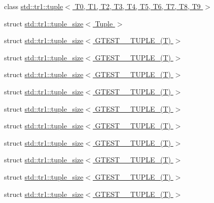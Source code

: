 \begin{DoxyCompactItemize}
class \hyperlink{classstd_1_1tr1_1_1tuple}{std\-::tr1\-::tuple$<$ T0, T1, T2, T3, T4, T5, T6, T7, T8, T9 $>$}
\item 
struct \hyperlink{structstd_1_1tr1_1_1tuple__size}{std\-::tr1\-::tuple\-\_\-size$<$ Tuple $>$}
\item 
struct \hyperlink{structstd_1_1tr1_1_1tuple__size_3_01_g_t_e_s_t__0___t_u_p_l_e___07_t_08_01_4}{std\-::tr1\-::tuple\-\_\-size$<$ G\-T\-E\-S\-T\-\_\-\_\-\-T\-U\-P\-L\-E\-\_\-(\-T) $>$}
\item 
struct \hyperlink{structstd_1_1tr1_1_1tuple__size_3_01_g_t_e_s_t__1___t_u_p_l_e___07_t_08_01_4}{std\-::tr1\-::tuple\-\_\-size$<$ G\-T\-E\-S\-T\-\_\-\_\-\-T\-U\-P\-L\-E\-\_\-(\-T) $>$}
\item 
struct \hyperlink{structstd_1_1tr1_1_1tuple__size_3_01_g_t_e_s_t__2___t_u_p_l_e___07_t_08_01_4}{std\-::tr1\-::tuple\-\_\-size$<$ G\-T\-E\-S\-T\-\_\-\_\-\-T\-U\-P\-L\-E\-\_\-(\-T) $>$}
\item 
struct \hyperlink{structstd_1_1tr1_1_1tuple__size_3_01_g_t_e_s_t__3___t_u_p_l_e___07_t_08_01_4}{std\-::tr1\-::tuple\-\_\-size$<$ G\-T\-E\-S\-T\-\_\-\_\-\-T\-U\-P\-L\-E\-\_\-(\-T) $>$}
\item 
struct \hyperlink{structstd_1_1tr1_1_1tuple__size_3_01_g_t_e_s_t__4___t_u_p_l_e___07_t_08_01_4}{std\-::tr1\-::tuple\-\_\-size$<$ G\-T\-E\-S\-T\-\_\-\_\-\-T\-U\-P\-L\-E\-\_\-(\-T) $>$}
\item 
struct \hyperlink{structstd_1_1tr1_1_1tuple__size_3_01_g_t_e_s_t__5___t_u_p_l_e___07_t_08_01_4}{std\-::tr1\-::tuple\-\_\-size$<$ G\-T\-E\-S\-T\-\_\-\_\-\-T\-U\-P\-L\-E\-\_\-(\-T) $>$}
\item 
struct \hyperlink{structstd_1_1tr1_1_1tuple__size_3_01_g_t_e_s_t__6___t_u_p_l_e___07_t_08_01_4}{std\-::tr1\-::tuple\-\_\-size$<$ G\-T\-E\-S\-T\-\_\-\_\-\-T\-U\-P\-L\-E\-\_\-(\-T) $>$}
\item 
struct \hyperlink{structstd_1_1tr1_1_1tuple__size_3_01_g_t_e_s_t__7___t_u_p_l_e___07_t_08_01_4}{std\-::tr1\-::tuple\-\_\-size$<$ G\-T\-E\-S\-T\-\_\-\_\-\-T\-U\-P\-L\-E\-\_\-(\-T) $>$}
\item 
struct \hyperlink{structstd_1_1tr1_1_1tuple__size_3_01_g_t_e_s_t__8___t_u_p_l_e___07_t_08_01_4}{std\-::tr1\-::tuple\-\_\-size$<$ G\-T\-E\-S\-T\-\_\-\_\-\-T\-U\-P\-L\-E\-\_\-(\-T) $>$}
\item 
struct \hyperlink{structstd_1_1tr1_1_1tuple__size_3_01_g_t_e_s_t__9___t_u_p_l_e___07_t_08_01_4}{std\-::tr1\-::tuple\-\_\-size$<$ G\-T\-E\-S\-T\-\_\-\_\-\-T\-U\-P\-L\-E\-\_\-(\-T) $>$}
\item 

\end{DoxyCompactItemize}
